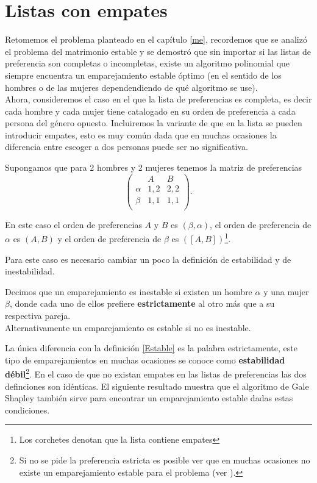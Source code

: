 \chapter{Listas con empates}

Retomemos el problema planteado en el capítulo \ref{me}, recordemos que se analizó el problema del matrimonio estable y se demostró que sin importar si las listas de preferencia son completas o incompletas, existe un algoritmo polinomial que siempre encuentra un emparejamiento estable óptimo (en el sentido de los hombres o de las mujeres dependendiendo de qué algoritmo se use). \\

Ahora, consideremos el caso en el que la lista de preferencias es completa, es decir cada hombre y cada mujer tiene catalogado en su orden de preferencia a cada persona del género opuesto. Incluiremos la variante de que en la lista se pueden introducir empates, esto es muy común dada que en muchas ocasiones la diferencia entre escoger a dos personas puede ser no significativa. 

\begin{eje}{\cite{Verde}}
\label{ejemplo empates}
Supongamos que para 2 hombres y 2 mujeres tenemos la matriz de preferencias 
$$\begin{pmatrix}
& A & B \\
\alpha & 1,2 & 2,2 \\
\beta & 1,1 & 1,1\\
\end{pmatrix}.$$

En este caso el orden de preferencias $A$ y $B$ es $(\beta, \alpha)$, el orden de preferencia de $\alpha$ es $(A,B)$ y el orden de preferencia de $\beta$ es $([A,B])$\footnote{Los corchetes denotan que la lista contiene empates}.
\fin
\end{eje}

Para este caso es necesario cambiar un poco la definición de estabilidad y de inestabilidad. 

\begin{dfn}{\cite{Verde}}
\label{estricto}
Decimos que un emparejamiento es inestable si existen un hombre $\alpha$ y una mujer $\beta$, donde cada uno de ellos prefiere \textbf{estrictamente} al otro más que a su respectiva pareja. \\
Alternativamente un emparejamiento es estable si no es inestable.
\end{dfn}

La única diferencia con la definición \ref{Estable} es la palabra estrictamente, este tipo de emparejamientos en muchas ocasiones se conoce como \textbf{estabilidad débil}\footnote{Si no se pide la preferencia estricta es posible ver que en muchas ocasiones no existe un emparejamiento estable para el problema (ver \cite{Verde}).}. En el caso de que no existan empates en las listas de preferencias las dos definciones son idénticas. El siguiente resultado muestra que el algoritmo de Gale Shapley también sirve para encontrar un emparejamiento estable dadas estas condiciones.


